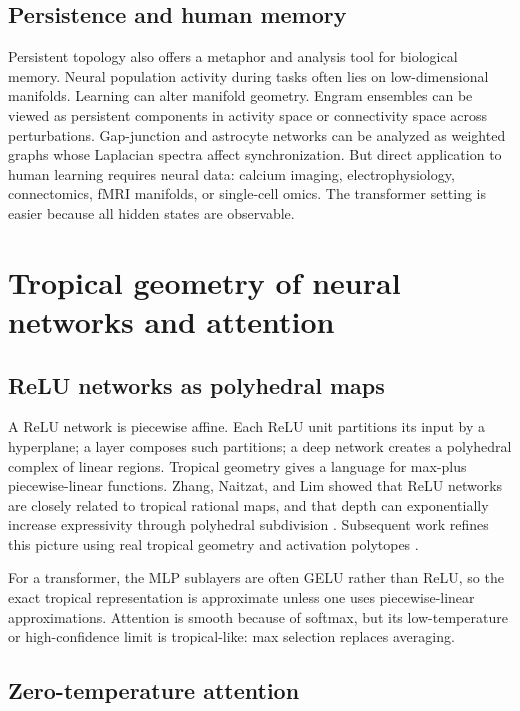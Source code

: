 \documentclass[11pt]{article}
\newcommand{\1}{\mathbf{1}}
\begin{document}
\subsection{Persistence and human memory}

Persistent topology also offers a metaphor and analysis tool for biological memory. Neural population activity during tasks often lies on low-dimensional manifolds. Learning can alter manifold geometry. Engram ensembles can be viewed as persistent components in activity space or connectivity space across perturbations. Gap-junction and astrocyte networks can be analyzed as weighted graphs whose Laplacian spectra affect synchronization. But direct application to human learning requires neural data: calcium imaging, electrophysiology, connectomics, fMRI manifolds, or single-cell omics. The transformer setting is easier because all hidden states are observable.

\section{Tropical geometry of neural networks and attention}

\subsection{ReLU networks as polyhedral maps}

A ReLU network is piecewise affine. Each ReLU unit partitions its input by a hyperplane; a layer composes such partitions; a deep network creates a polyhedral complex of linear regions. Tropical geometry gives a language for max-plus piecewise-linear functions. Zhang, Naitzat, and Lim showed that ReLU networks are closely related to tropical rational maps, and that depth can exponentially increase expressivity through polyhedral subdivision \cite{ZhangTropical2018}. Subsequent work refines this picture using real tropical geometry and activation polytopes \cite{Brandenburg2024}.

For a transformer, the MLP sublayers are often GELU rather than ReLU, so the exact tropical representation is approximate unless one uses piecewise-linear approximations. Attention is smooth because of softmax, but its low-temperature or high-confidence limit is tropical-like: max selection replaces averaging.

\subsection{Zero-temperature attention}
\end{document}
